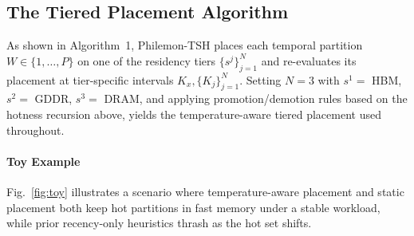 \documentclass{article}
\begin{document}
\subsection{The Tiered Placement Algorithm}
\label{sec:system_algorithm}

As shown in Algorithm~1, Philemon-TSH places each temporal partition
$W \in \{1,\dots,P\}$ on one of the residency tiers $\{s^j\}_{j=1}^N$ and re-evaluates
its placement at tier-specific intervals $K_x, \{K_j\}_{j=1}^N$. Setting $N = 3$ with
$s^1 = $ HBM, $s^2 = $ GDDR, $s^3 = $ DRAM, and applying promotion/demotion rules
based on the hotness recursion above, yields the temperature-aware tiered placement
used throughout.

\paragraph{Toy Example} Fig.~\ref{fig:toy} illustrates a scenario where
temperature-aware placement and static placement both keep hot partitions in fast
memory under a stable workload, while prior recency-only heuristics thrash as the hot
set shifts.
\end{document}
